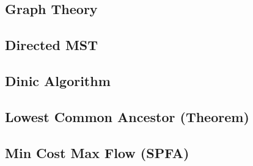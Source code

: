 \subsection{Graph Theory}


\subsection{Directed MST}


% 

\subsection{Dinic Algorithm}


% 

\subsection{Lowest Common Ancestor (Theorem)}


% 

% 

\subsection{Min Cost Max Flow (SPFA)}



